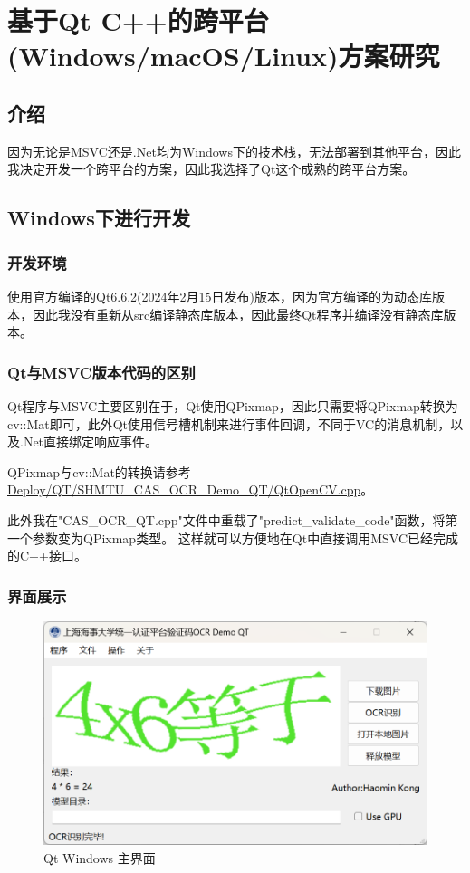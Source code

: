 \chapter{基于Qt C++的跨平台(Windows/macOS/Linux)方案研究}
\label{chapter:11}

\section{介绍}

因为无论是MSVC还是.Net均为Windows下的技术栈，无法部署到其他平台，因此我决定开发一个跨平台的方案，因此我选择了Qt这个成熟的跨平台方案。

\section{Windows下进行开发}

\subsection{开发环境}

使用官方编译的Qt6.6.2(2024年2月15日发布)版本，因为官方编译的为动态库版本，因此我没有重新从src编译静态库版本，因此最终Qt程序并编译没有静态库版本。

\subsection{Qt与MSVC版本代码的区别}

Qt程序与MSVC主要区别在于，Qt使用QPixmap，因此只需要将QPixmap转换为cv::Mat即可，此外Qt使用信号槽机制来进行事件回调，不同于VC的消息机制，以及.Net直接绑定响应事件。

QPixmap与cv::Mat的转换请参考\url{Deploy/QT/SHMTU_CAS_OCR_Demo_QT/QtOpenCV.cpp}。

此外我在"CAS\_OCR\_QT.cpp"文件中重载了"predict\_validate\_code"函数，将第一个参数变为QPixmap类型。
这样就可以方便地在Qt中直接调用MSVC已经完成的C++接口。

\subsection{界面展示}

\begin{figure}
	\centering
	\includegraphics[width=0.9\linewidth]{Resources/Picture/Deploy/Qt/Windows/qt_win_main}
	\caption{Qt Windows 主界面}
	\label{fig:qtwinmain}
\end{figure}

